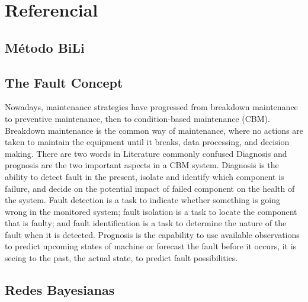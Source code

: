\section{Referencial}

\subsection{Método BiLi}


\subsection{The Fault Concept}
Nowadays, maintenance strategies have progressed from breakdown maintenance to preventive maintenance, then to condition-based maintenance (CBM). Breakdown maintenance is the common way of maintenance, where no actions are taken to maintain the equipment until it breaks, data processing, and decision making. There are two words in Literature commonly confused Diagnosis and prognosis are the two important aspects in a CBM system. Diagnosis is the ability to detect fault in the present, isolate and identify which component is failure, and decide on the potential impact of failed component on the health of the system. Fault detection is a task to indicate whether something is going wrong in the monitored system; fault isolation is a task to locate the component that is faulty; and fault identification is a task to determine the nature of the fault when it is detected. Prognosis is the capability to use available observations to predict upcoming states of machine or forecast the fault before it occurs, it is seeing to the past, the actual state, to predict fault possibilities\cite{van2009machine}.


\subsection{Redes Bayesianas}

